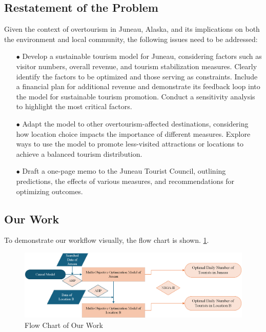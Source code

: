 \documentclass[12pt]{article}  %
\begin{document}
 \subsection{Restatement of the Problem}
 Given the context of overtourism in Juneau, Alaska, and its implications on both the environment and local community, the following issues need to be addressed:
 \begin{itemize}
    \item[$\bullet$]Develop a sustainable tourism model for Juneau, considering factors such as visitor numbers, overall revenue, and tourism stabilization measures. Clearly identify the factors to be optimized and those serving as constraints. Include a financial plan for additional revenue and demonstrate its feedback loop into the model for sustainable tourism promotion. Conduct a sensitivity analysis to highlight the most critical factors.
    \item[$\bullet$]Adapt the model to other overtourism-affected destinations, considering how location choice impacts the importance of different measures. Explore ways to use the model to promote less-visited attractions or locations to achieve a balanced tourism distribution.
    \item[$\bullet$]Draft a one-page memo to the Juneau Tourist Council, outlining predictions, the effects of various measures, and recommendations for optimizing outcomes.
 \end{itemize}
\subsection{Our Work}
 
To demonstrate our workflow visually, the flow chart is shown. 
\ref{fig1}.
  

 \begin{figure}[h]  %
 
 \centering  %
 \includegraphics[width=.9\textwidth]{chart2.png} %
 \caption{Flow Chart of Our Work} %
 \label{fig1}%
 \end{figure}
 
\end{document}
